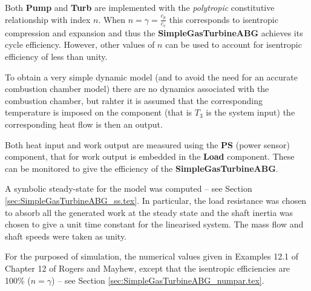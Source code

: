 Both \textbf{Pump} and \textbf{Turb} are implemented with the
\emph{polytropic} constitutive relationship with index $n$. When
$n=\gamma=\frac{c_p}{c_v}$ this corresponds to isentropic compression
and expansion and thus the \textbf{SimpleGasTurbineABG} achieves its
cycle efficiency. However, other values of $n$ can be used to account
for isentropic efficiency of less than unity.

To obtain a very simple dynamic model (and to avoid the need for an
accurate combustion chamber model) there are no dynamics associated
with the combustion chamber, but rahter it is assumed that the
corresponding temperature is imposed on the component (that is $T_3$
is the system input) the corresponding heat flow is then an output.

Both heat input and work output are measured using the \textbf{PS}
(power sensor) component, that for work output is embedded in the
\textbf{Load} component. These can be monitored to give the efficiency
of the \textbf{SimpleGasTurbineABG}.

A symbolic steady-state for the model was computed -- see Section
\ref{sec:SimpleGasTurbineABG_ss.tex}. In particular, the load
resistance was chosen to absorb all the generated work at the steady
state and the shaft inertia was chosen to give a unit time constant
for the linearised system. The mass flow and shaft speeds were taken
as unity.

For the purposed of simulation, the numerical values given in Examples
12.1 of Chapter 12 of Rogers and Mayhew, except that the isentropic
efficiencies are 100\% ($n=\gamma$) -- see Section
\ref{sec:SimpleGasTurbineABG_numpar.tex}.

